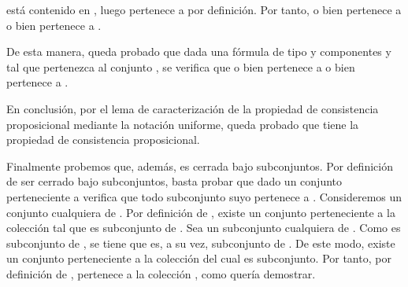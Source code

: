 \begin{isabellebody}
\begin{isamarkuptext}
\begin{demostracion}
\begin{itemize}
       está contenido en , luego  pertenece a  por definición.
      Por tanto, o bien  pertenece a  o bien  pertenece a .
    \end{itemize}
    De esta manera, queda probado que dada una fórmula de tipo \isa{{\isasymbeta}} y componentes  y  tal que
    pertenezca al conjunto , se verifica que o bien  pertenece a  o bien 
    pertenece a .

  En conclusión, por el lema de caracterización de la propiedad de consistencia proposicional
  mediante la notación uniforme, queda probado que  tiene la propiedad de consistencia
  proposicional. 

  Finalmente probemos que, además,  es cerrada bajo subconjuntos. Por definición de ser cerrado
  bajo subconjuntos, basta probar que dado un conjunto perteneciente a  verifica que todo 
  subconjunto suyo pertenece a . Consideremos  un conjunto cualquiera de . Por
  definición de , existe un conjunto  perteneciente a la colección  tal que  es
  subconjunto de . Sea  un subconjunto cualquiera de . Como  es subconjunto de ,
  se tiene que  es, a su vez, subconjunto de . De este modo, existe un conjunto 
  perteneciente a la colección  del cual  es subconjunto. Por tanto, por definición de , 
   pertenece a la colección , como quería demostrar.
\end{demostracion}


\end{isamarkuptext}
\end{isabellebody}
